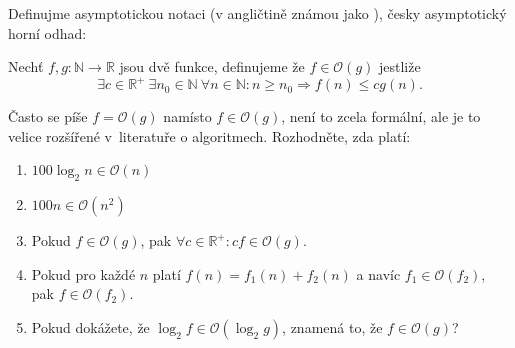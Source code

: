 Definujme asymptotickou notaci (v angličtině známou jako ), česky asymptotický horní odhad:

Nechť $f, g \colon \mathbb{N} \rightarrow \mathbb{R}$ jsou dvě funkce, definujeme že $f \in \mathcal{O}(g)$ jestliže
$$\exists c \in \mathbb{R}^+ \  \exists n_0 \in \mathbb{N} \  \forall n \in \mathbb{N} \colon n \geq n_0 \Rightarrow f(n) \leq cg(n).$$

Často se píše $f = \mathcal{O}(g)$ namísto $f \in \mathcal{O}(g)$, není to zcela formální, ale je to velice rozšířené v~literatuře o algoritmech.
Rozhodněte, zda platí:
\begin{enumerate}
	\item  $100 \log_2 n \in \mathcal{O}(n)$
	\item  $100 n \in  \mathcal{O}(n^2)$
	\item  Pokud $f \in \mathcal{O}(g)$, pak $\forall c \in \mathbb{R}^+ \colon cf \in \mathcal{O}(g)$.
	\item  Pokud pro každé $n$ platí $f(n) = f_1(n) + f_2(n)$ a navíc $f_1 \in \mathcal{O}(f_2)$, pak $f \in \mathcal{O}(f_2)$.
	\item  Pokud dokážete, že $\log_2 f \in \mathcal{O}(\log_2 g)$, znamená to, že $f \in \mathcal{O}(g)$?
\end{enumerate}

